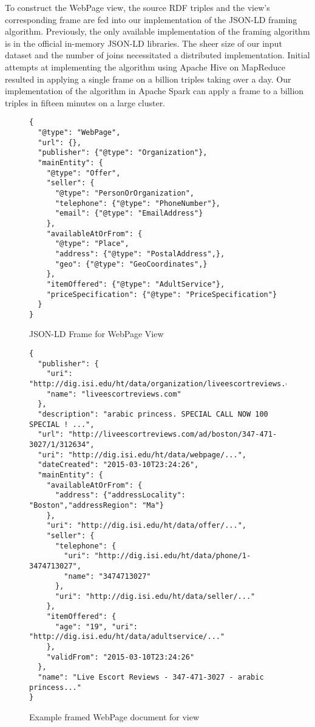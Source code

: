 To construct the WebPage view, the source RDF triples and the view's corresponding frame are fed into our implementation of the JSON-LD framing algorithm.  
Previously, the only available implementation of the framing algorithm is in the official in-memory JSON-LD libraries.  
The sheer size of our input dataset and the number of joins necessitated a distributed implementation. 
Initial attempts at implementing the algorithm using Apache Hive on MapReduce resulted in applying a single frame on a billion triples taking over a day.  
Our implementation of the algorithm in Apache Spark can apply a frame to a billion triples in fifteen minutes on a large cluster.
\begin{figure}[h]
\vspace{-0.2cm}
{\footnotesize
\begin{verbatim}
{
  "@type": "WebPage",
  "url": {},
  "publisher": {"@type": "Organization"},
  "mainEntity": {
    "@type": "Offer",
    "seller": {
      "@type": "PersonOrOrganization",
      "telephone": {"@type": "PhoneNumber"},
      "email": {"@type": "EmailAddress"}
    },
    "availableAtOrFrom": {
      "@type": "Place",
      "address": {"@type": "PostalAddress",},
      "geo": {"@type": "GeoCoordinates",}
    },
    "itemOffered": {"@type": "AdultService"},
    "priceSpecification": {"@type": "PriceSpecification"}
  }
}
\end{verbatim}}
\caption{JSON-LD Frame for WebPage View}
\label{fig:json_ld_webpage_view}
\vspace{-0.2cm}
\end{figure}
\begin{figure}[h!]
\vspace{-0.2cm}
{\footnotesize
\begin{verbatim}
{
  "publisher": {
    "uri": "http://dig.isi.edu/ht/data/organization/liveescortreviews.com",
    "name": "liveescortreviews.com"
  },
  "description": "arabic princess. SPECIAL CALL NOW 100 SPECIAL ! ...",
  "url": "http://liveescortreviews.com/ad/boston/347-471-3027/1/312634",
  "uri": "http://dig.isi.edu/ht/data/webpage/...",
  "dateCreated": "2015-03-10T23:24:26",
  "mainEntity": {
    "availableAtOrFrom": {
      "address": {"addressLocality": "Boston","addressRegion": "Ma"}
    },
    "uri": "http://dig.isi.edu/ht/data/offer/...",
    "seller": {
      "telephone": {
        "uri": "http://dig.isi.edu/ht/data/phone/1-3474713027",
        "name": "3474713027"
      },
      "uri": "http://dig.isi.edu/ht/data/seller/..."
    },
    "itemOffered": {
      "age": "19", "uri": "http://dig.isi.edu/ht/data/adultservice/..."
    },
    "validFrom": "2015-03-10T23:24:26"
  },
  "name": "Live Escort Reviews - 347-471-3027 - arabic princess..."
}
\end{verbatim}}
\vspace{-0.2cm}
\caption{Example framed WebPage document for view}
\label{fig:framed-webpage}
\end{figure}
